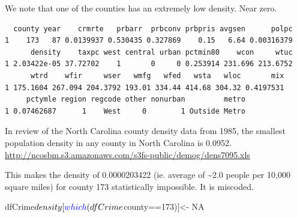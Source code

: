 \documentclass[]{article}
\newenvironment{Shaded}{}{}
\newcommand{\DecValTok}[1]{#1}
\newcommand{\FloatTok}[1]{#1}
\newcommand{\KeywordTok}[1]{\textcolor[rgb]{0.00,0.00,1.00}{#1}}
\newcommand{\NormalTok}[1]{#1}
\newcommand{\OperatorTok}[1]{#1}
\newcommand{\OtherTok}[1]{\textcolor[rgb]{1.00,0.25,0.00}{#1}}
\newcommand{\StringTok}[1]{\textcolor[rgb]{0.00,0.50,0.50}{#1}}
\begin{document}
We note that one of the counties has an extremely low density. Near
zero.

\begin{Shaded}
\end{Shaded}

\begin{verbatim}
  county year    crmrte   prbarr  prbconv prbpris avgsen      polpc
1    173   87 0.0139937 0.530435 0.327869    0.15   6.64 0.00316379
      density    taxpc west central urban pctmin80    wcon     wtuc
1 2.03422e-05 37.72702    1       0     0 0.253914 231.696 213.6752
      wtrd    wfir     wser   wmfg   wfed   wsta   wloc       mix
1 175.1604 267.094 204.3792 193.01 334.44 414.68 304.32 0.4197531
     pctymle region regcode other nonurban         metro
1 0.07462687      1    West     0        1 Outside Metro
\end{verbatim}

In review of the North Carolina county density data from 1985, the
smallest population density in any county in North Carolina is 0.0952.
\url{http://ncosbm.s3.amazonaws.com/s3fs-public/demog/dens7095.xls}

This makes the density of 0.0000203422 (ie. average of
\textasciitilde{}2.0 people per 10,000 square miles) for county 173
statistically impossible. It is miscoded.

\begin{Shaded}
\begin{Highlighting}[]
\NormalTok{dfCrime}\OperatorTok{$}\NormalTok{density[}\KeywordTok{which}\NormalTok{(dfCrime}\OperatorTok{$}\NormalTok{county}\OperatorTok{==}\DecValTok{173}\NormalTok{)]<-}\StringTok{ }\OtherTok{NA}
\end{Highlighting}
\end{Shaded}
\end{document}

